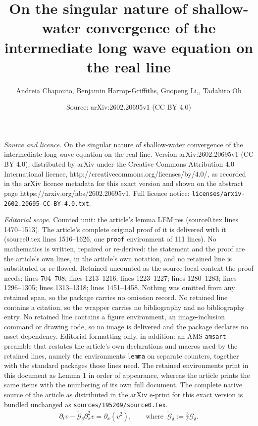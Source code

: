 \documentclass[10pt,a4paper]{amsart}
\title{On the singular nature of shallow-water convergence of the intermediate long wave equation on the real line}
\author{Andreia Chapouto, Benjamin Harrop-Griffiths, Guopeng Li,, Tadahiro Oh}
\date{Source: arXiv:2602.20695v1 (CC BY 4.0)}
\newcommand{\Gd}{\wt{\mathcal{G}}_\dl}
\newcommand{\Gdl}{\mathcal{G}_{\dl} }
\newcommand{\dl}{\delta}
\newcommand{\dt}{\partial_t}
\newcommand{\dx}{\partial_x}
\newcommand{\wt}{\widetilde}
\begin{document}
\maketitle

\noindent\emph{Source and licence.} On the singular nature of shallow-water convergence of the intermediate long wave equation on the real line. Version arXiv:2602.20695v1 (CC BY 4.0), distributed by arXiv under the Creative Commons Attribution 4.0 International licence, http://creativecommons.org/licenses/by/4.0/, as recorded in the arXiv licence metadata for this exact version and shown on the abstract page https://arxiv.org/abs/2602.20695v1. Full licence notice: \texttt{licenses/arxiv-2602.20695-CC-BY-4.0.txt}.\par\smallskip

\noindent\textit{Editorial scope.} Counted unit: the article's lemma LEM:res (source0.tex lines 1470--1513). The article's complete original proof of it is delivered with it (source0.tex lines 1516--1626, one \texttt{proof} environment of 111 lines). No mathematics is written, repaired or re-derived: the statement and the proof are the article's own lines, in the article's own notation, and no retained line is substituted or re-flowed.  Retained uncounted as the source-local context the proof needs: lines 704--708; lines 1213--1216; lines 1223--1227; lines 1280--1283; lines 1296--1305; lines 1313--1318; lines 1451--1458.  Nothing was omitted from any retained span, so the package carries no omission record.  No retained line contains a citation, so the wrapper carries no bibliography and no bibliography entry.  No retained line contains a figure environment, an image-inclusion command or drawing code, so no image is delivered and the package declares no asset dependency.  Editorial formatting only, in addition: an AMS \texttt{amsart} preamble that restates the article's own declarations and macros used by the retained lines, namely the environments \texttt{lemma} on separate counters, together with the standard packages those lines need.  The retained environments print in this document as Lemma 1 in order of appearance, whereas the article prints the same items with the numbering of its own full document.  The complete native source of the article as distributed in the arXiv e-print for this exact version is bundled unchanged as \texttt{sources/195209/source0.tex}.
\begin{align}
\dt v   -    \Gd   \dx^2 v= \dx(v^2), 
\qquad \text{where }\ \Gd := \frac3\dl \Gdl.
\label{sILW1}
\end{align}
\end{document}
